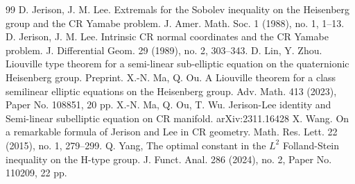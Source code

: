\documentclass[10pt,a4paper]{amsart}
\numberwithin{equation}{section}
\begin{document}
\begin{thebibliography}{99}
 D. Jerison, J. M. Lee. Extremals for the Sobolev inequality on the Heisenberg group and the CR Yamabe problem. J. Amer. Math. Soc. 1 (1988), no. 1, 1–13.
 D. Jerison, J. M. Lee. Intrinsic CR normal coordinates and the CR Yamabe problem. J. Differential Geom. 29 (1989), no. 2, 303–343.
 D. Lin, Y. Zhou. Liouville type theorem for a semi-linear sub-elliptic equation on the quaternionic Heisenberg group. Preprint.
 X.-N. Ma, Q. Ou. A Liouville theorem for a class semilinear elliptic equations on the Heisenberg group. Adv. Math. 413 (2023), Paper No. 108851, 20 pp.
 X.-N. Ma, Q. Ou, T. Wu. Jerison-Lee identity and Semi-linear subelliptic equation on CR manifold. arXiv:2311.16428
 X. Wang. On a remarkable formula of Jerison and Lee in CR geometry. Math. Res. Lett. 22 (2015), no. 1, 279–299.
 Q. Yang, The optimal constant in the $L^2$ Folland-Stein inequality on the H-type group. J. Funct. Anal. 286 (2024), no. 2, Paper No. 110209, 22 pp.
\end{thebibliography}
\end{document}
